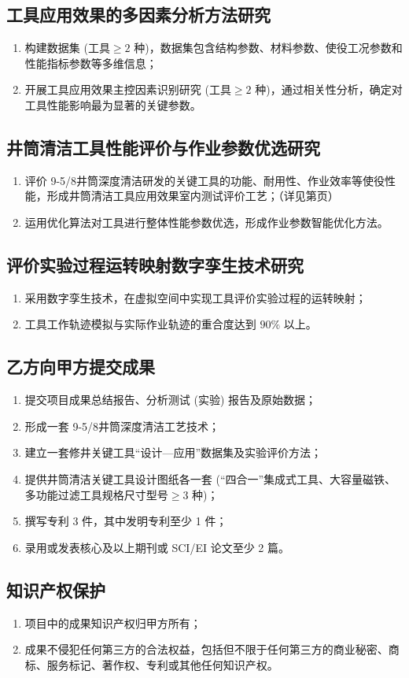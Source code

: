 \subsection{工具应用效果的多因素分析方法研究}
\begin{enumerate}[label=(\arabic*),leftmargin=2em,itemsep=0pt]
\item 构建数据集 (工具$\ge 2$ 种)，数据集包含结构参数、材料参数、使役工况参数和性能指标参数等多维信息；
\item 开展工具应用效果主控因素识别研究 (工具$\ge 2$ 种)，通过相关性分析，确定对工具性能影响最为显著的关键参数。
\end{enumerate}

\subsection{井筒清洁工具性能评价与作业参数优选研究}
\begin{enumerate}[label=(\arabic*),leftmargin=2em,itemsep=0pt]
\item 评价 9-5/8\inch  井筒深度清洁研发的关键工具的功能、耐用性、作业效率等使役性能，形成井筒清洁工具应用效果室内测试评价工艺；（详见第\pageref{guaban}页）
\item 运用优化算法对工具进行整体性能参数优选，形成作业参数智能优化方法。
\end{enumerate}

\subsection{评价实验过程运转映射数字孪生技术研究}
\begin{enumerate}[label=(\arabic*),leftmargin=2em,itemsep=0pt]
\item 采用数字孪生技术，在虚拟空间中实现工具评价实验过程的运转映射；
\item 工具工作轨迹模拟与实际作业轨迹的重合度达到 $90\%$ 以上。
\end{enumerate}

\subsection{乙方向甲方提交成果}
\begin{enumerate}[label=(\arabic*),leftmargin=2em,itemsep=0pt]
\item 提交项目成果总结报告、分析测试 (实验) 报告及原始数据；
\item 形成一套 9-5/8\inch  井筒深度清洁工艺技术；
\item 建立一套修井关键工具“设计—应用”数据集及实验评价方法；
\item 提供井筒清洁关键工具设计图纸各一套 (“四合一”集成式工具、大容量磁铁、多功能过滤工具规格尺寸型号$\ge 3$ 种)；
\item 撰写专利 3 件，其中发明专利至少 1 件；
\item 录用或发表核心及以上期刊或 SCI/EI 论文至少 2 篇。
\end{enumerate}

\subsection{知识产权保护}
\begin{enumerate}[label=(\arabic*),leftmargin=2em,itemsep=0pt]
\item 项目中的成果知识产权归甲方所有；
\item 成果不侵犯任何第三方的合法权益，包括但不限于任何第三方的商业秘密、商标、服务标记、著作权、专利或其他任何知识产权。
\end{enumerate}